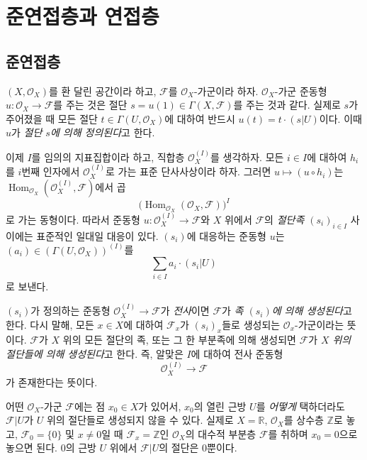 \section{준연접층과 연접층}
\label{section:0.5-ko}

\subsection{준연접층}
\label{subsection:0.5.1-ko}

\begin{env}[5.1.1]
\label{0.5.1.1-ko}
$(X,\mathcal O_X)$를 환 달린 공간이라 하고, $\mathcal F$를
$\mathcal O_X$-가군이라 하자. $\mathcal O_X$-가군 준동형
$u:\mathcal O_X\to\mathcal F$를 주는 것은 절단
$s=u(1)\in\Gamma(X,\mathcal F)$를 주는 것과 같다. 실제로 $s$가
주어졌을 때 모든 절단 $t\in\Gamma(U,\mathcal O_X)$에 대하여 반드시
$u(t)=t\cdot(s|U)$이다. 이때 $u$가 \emph{절단 $s$에 의해 정의된다}고
한다.

이제 $I$를 임의의 지표집합이라 하고, 직합층
$\mathcal O_X^{(I)}$를 생각하자. 모든 $i\in I$에 대하여 $h_i$를
$i$번째 인자에서 $\mathcal O_X^{(I)}$로 가는 표준 단사사상이라 하자.
그러면 $u\mapsto(u\circ h_i)$는
$\operatorname{Hom}_{\mathcal O_X}(\mathcal O_X^{(I)},\mathcal F)$에서
곱
\[
  \bigl(\operatorname{Hom}_{\mathcal O_X}
  (\mathcal O_X,\mathcal F)\bigr)^I
\]
로 가는 동형이다. 따라서 준동형
$u:\mathcal O_X^{(I)}\to\mathcal F$와 $X$ 위에서 $\mathcal F$의
\emph{절단족 $(s_i)_{i\in I}$} 사이에는 표준적인 일대일 대응이 있다.
$(s_i)$에 대응하는 준동형 $u$는
$(a_i)\in(\Gamma(U,\mathcal O_X))^{(I)}$를
\[
  \sum_{i\in I}a_i\cdot(s_i|U)
\]
로 보낸다.

$(s_i)$가 정의하는 준동형
$\mathcal O_X^{(I)}\to\mathcal F$가 \emph{전사}이면
$\mathcal F$가 \emph{족 $(s_i)$에 의해 생성된다}고 한다. 다시 말해,
모든 $x\in X$에 대하여 $\mathcal F_x$가 $(s_i)_x$들로 생성되는
$\mathcal O_x$-가군이라는 뜻이다. $\mathcal F$가 $X$ 위의 모든 절단의
족, 또는 그 한 부분족에 의해 생성되면 $\mathcal F$가
\emph{$X$ 위의 절단들에 의해 생성된다}고 한다. 즉, 알맞은 $I$에
대하여 전사 준동형
\[
  \mathcal O_X^{(I)}\longrightarrow\mathcal F
\]
가 존재한다는 뜻이다.

어떤 $\mathcal O_X$-가군 $\mathcal F$에는 점 $x_0\in X$가 있어서,
$x_0$의 열린 근방 $U$를 \emph{어떻게} 택하더라도
$\mathcal F|U$가 $U$ 위의 절단들로 생성되지 않을 수 있다.
실제로 $X=\mathbb R$, $\mathcal O_X$를 상수층 $\mathbb Z$로 놓고,
$\mathcal F_0=\{0\}$ 및 $x\ne0$일 때
$\mathcal F_x=\mathbb Z$인 $\mathcal O_X$의 대수적 부분층
$\mathcal F$를 취하며 $x_0=0$으로 놓으면 된다. $0$의 근방 $U$ 위에서
$\mathcal F|U$의 절단은 $0$뿐이다.
\end{env}

